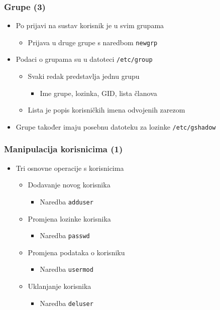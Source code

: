 \documentclass{beamer}
\newcommand{\shell}[1]{\texttt{#1}}
\begin{document}
\begin{frame}[t]
\frametitle{Grupe (3)}
\begin{itemize}
  \item Po prijavi na sustav korisnik je u svim grupama
  \begin{itemize}
    \item Prijava u druge grupe s naredbom \shell{newgrp}
  \end{itemize}
  \item Podaci o grupama su u datoteci \shell{/etc/group}
  \begin{itemize}
    \item Svaki redak predstavlja jednu grupu
    \begin{itemize}
      \item Ime grupe, lozinka, GID, lista članova
    \end{itemize}
    \item Lista je popis korisničkih imena odvojenih zarezom
  \end{itemize}
  \item Grupe također imaju posebnu datoteku za lozinke 
        \shell{/etc/gshadow}
\end{itemize}
\end{frame}

\begin{frame}[t]
\frametitle{Manipulacija korisnicima (1)}
\begin{itemize}
  \item Tri osnovne operacije s korisnicima
  \begin{itemize}
    \item Dodavanje novog korisnika
    \begin{itemize}
      \item Naredba \shell{adduser}
    \end{itemize}
    \item Promjena lozinke korisnika
    \begin{itemize}
      \item Naredba \shell{passwd}
    \end{itemize}
    \item Promjena podataka o korisniku
    \begin{itemize}
      \item Naredba \shell{usermod}
    \end{itemize}
    \item Uklanjanje korisnika
    \begin{itemize}
      \item Naredba \shell{deluser}
    \end{itemize}
  \end{itemize}
\end{itemize}
\end{frame}
\end{document}

